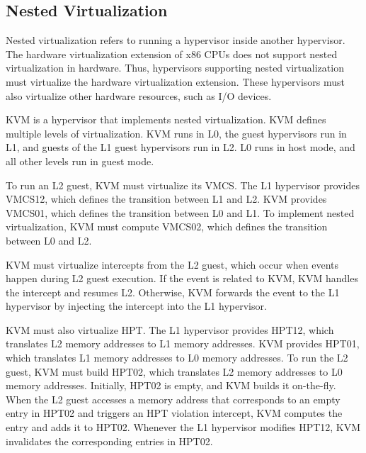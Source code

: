 \subsection{Nested Virtualization}

Nested virtualization refers to running a hypervisor inside another hypervisor. The hardware virtualization extension of x86 CPUs does not support nested virtualization in hardware. Thus, hypervisors supporting nested virtualization must virtualize the hardware virtualization extension. These hypervisors must also virtualize other hardware resources, such as I/O devices.

KVM \cite{ben2010turtles} is a hypervisor that implements nested virtualization. KVM defines multiple levels of virtualization. KVM runs in L0, the guest hypervisors run in L1, and guests of the L1 guest hypervisors run in L2. L0 runs in host mode, and all other levels run in guest mode.

To run an L2 guest, KVM must virtualize its VMCS. The L1 hypervisor provides VMCS12, which defines the transition between L1 and L2. KVM provides VMCS01, which defines the transition between L0 and L1. To implement nested virtualization, KVM must compute VMCS02, which defines the transition between L0 and L2.

KVM must virtualize intercepts from the L2 guest, which occur when events happen during L2 guest execution. If the event is related to KVM, KVM handles the intercept and resumes L2. Otherwise, KVM forwards the event to the L1 hypervisor by injecting the intercept into the L1 hypervisor.

KVM must also virtualize HPT. The L1 hypervisor provides HPT12, which translates L2 memory addresses to L1 memory addresses. KVM provides HPT01, which translates L1 memory addresses to L0 memory addresses. To run the L2 guest, KVM must build HPT02, which translates L2 memory addresses to L0 memory addresses. Initially, HPT02 is empty, and KVM builds it on-the-fly. When the L2 guest accesses a memory address that corresponds to an empty entry in HPT02 and triggers an HPT violation intercept, KVM computes the entry and adds it to HPT02. Whenever the L1 hypervisor modifies HPT12, KVM invalidates the corresponding entries in HPT02.

